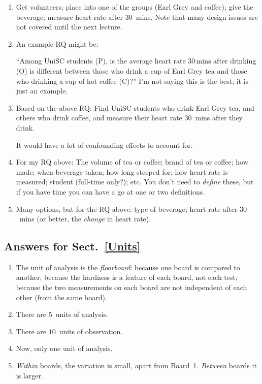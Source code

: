 \documentclass[
  11pt,
  a4paper,
  krantz2]{krantz}
\providecommand{\tightlist}{%
  \setlength{\itemsep}{0pt}\setlength{\parskip}{0pt}}
\begin{document}
\begin{footnotesize}
\begin{enumerate}
  I'm not saying this is the best; it is just an example.
\item
  Get volunteers; place into one of the groups (Earl Grey and coffee); give the beverage; measure heart rate after \(30\)~mins.
  Note that many design issues are not covered until the next lecture.
\item
  An example RQ might be:

  ``Among UniSC students (P), is the average heart rate \(30\,\text{mins}\) after drinking (O) is different between those who drink a cup of Earl Grey tea and those who drinking a cup of hot coffee (C)?''
  I'm not saying this is the best; it is just an example.
\item
  Based on the above RQ: Find UniSC students who drink Earl Grey tea, and others who drink coffee, and measure their heart rate \(30\)~mins after they drink.

  It would have a lot of confounding effects to account for.
\item
  For my RQ above: The volume of tea or coffee; brand of tea or coffee; how made; when beverage taken; how long steeped for; how heart rate is measured; student (full-time only?); etc.
  You don't need to \emph{define} these, but if you have time you can have a go at one or two definitions.
\item
  Many options, but for the RQ above: type of beverage; heart rate after \(30\)~mins (or better, the \emph{change} in heart rate).
\end{enumerate}

\subsection*{Answers for Sect.~\ref{Units}}\label{answers-for-sect.-refunits}

\begin{enumerate}
\def\labelenumi{\arabic{enumi}.}
\tightlist
\item
  The unit of analysis is the \emph{floorboard}: because one board is compared to another; because the hardness is a feature of each board, not each test; because the two measurements on each board are not independent of each other (from the same board).
\item
  There are \(5\)~units of analysis.
\item
  There are \(10\)~units of observation.
\item
  Now, only one unit of analysis.
\item
  \emph{Within} boards, the variation is small, apart from Board~1.
  \emph{Between} boards it is larger.
\end{enumerate}


\end{footnotesize}
\end{document}
